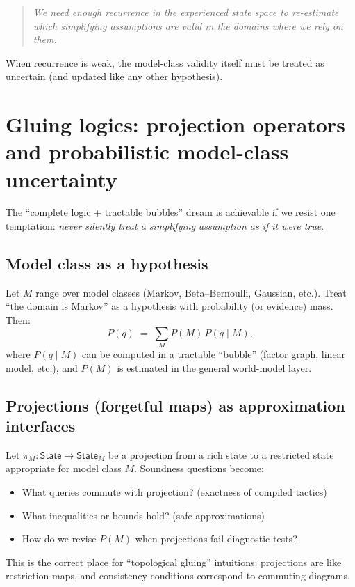 \documentclass[11pt]{article}
\newcommand{\State}{\mathsf{State}}
\begin{document}
\begin{quote}
\emph{We need enough recurrence in the experienced state space to re-estimate which simplifying
assumptions are valid in the domains where we rely on them.}
\end{quote}

When recurrence is weak, the model-class validity itself must be treated as uncertain
(and updated like any other hypothesis).

\section{Gluing logics: projection operators and probabilistic model-class uncertainty}

The ``complete logic + tractable bubbles'' dream is achievable if we resist one temptation:
\emph{never silently treat a simplifying assumption as if it were true}.

\subsection{Model class as a hypothesis}

Let $M$ range over model classes (Markov, Beta--Bernoulli, Gaussian, etc.).
Treat ``the domain is Markov'' as a hypothesis with probability (or evidence) mass.
Then:
\[
  P(q) \;=\; \sum_M P(M)\, P(q \mid M),
\]
where $P(q\mid M)$ can be computed in a tractable ``bubble'' (factor graph, linear model, etc.),
and $P(M)$ is estimated in the general world-model layer.

\subsection{Projections (forgetful maps) as approximation interfaces}

Let $\pi_M : \State \to \State_M$ be a projection from a rich state to a restricted state
appropriate for model class $M$. Soundness questions become:
\begin{itemize}[leftmargin=2em]
\item What queries commute with projection? (exactness of compiled tactics)
\item What inequalities or bounds hold? (safe approximations)
\item How do we revise $P(M)$ when projections fail diagnostic tests?
\end{itemize}

This is the correct place for ``topological gluing'' intuitions:
projections are like restriction maps, and consistency conditions correspond to commuting diagrams.
\end{document}
